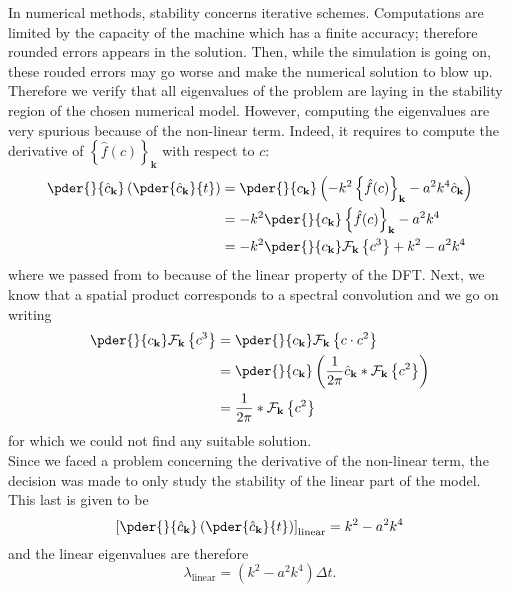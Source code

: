 \documentclass[10pt,a4paper,twocolumn]{article}
\begin{document}
In numerical methods, stability concerns iterative schemes. Computations are limited by the capacity of the machine which has a finite accuracy; therefore rounded errors appears in the solution. Then, while the simulation is going on, these rouded errors may go worse and make the numerical solution to blow up. Therefore we verify that all eigenvalues of the problem are laying in the stability region of the chosen numerical model. However, computing the eigenvalues are very spurious because of the non-linear term. Indeed, it requires to compute the derivative of $\left\{\hat f(c)\right\}_\mathbf{k}$ with respect to $c$:
\begin{align}
	\pder{}{\hat c_\mathbf{k}}\left(\pder{\hat c_\mathbf{k}}{t}\right) &= \pder{}{c_\mathbf{k}} \left( -k^2 \left\{ \hat f(c) \right\}_\mathbf{k} - a^2 k^4 \hat c_\mathbf{k} \right) \label{eq:stability_1} \\
	&= -k^2 \pder{}{c_\mathbf{k}} \left\{ \hat f(c) \right\}_\mathbf{k} - a^2 k^4 \label{eq:stability_2} \\
	&= -k^2 \pder{}{c_\mathbf{k}} \mathcal{F}_\mathbf{k}\left\{ c^3 \right\} + k^2 - a^2 k^4 \label{eq:stability_3}
\end{align}
where we passed from  to  because of the linear property of the DFT. Next, we know that a spatial product corresponds to a spectral convolution and we go on writing
\begin{align}
	\pder{}{c_\mathbf{k}} \mathcal{F}_\mathbf{k}\left\{ c^3 \right\} &= \pder{}{c_\mathbf{k}} \mathcal{F}_\mathbf{k}\left\{ c \cdot c^2 \right\} \\
	&= \pder{}{c_\mathbf{k}} \left( \frac{1}{2\pi} \hat c_\mathbf{k} * \mathcal{F}_\mathbf{k}\left\{ c^2 \right\} \right) \\
	&= \frac{1}{2\pi} * \mathcal{F}_\mathbf{k}\left\{ c^2 \right\}
\end{align}
for which we could not find any suitable solution.
\vspace{\baselineskip}\\
Since we faced a problem concerning the derivative of the non-linear term, the decision was made to only study the stability of the linear part of the model. This last is given to be
\begin{equation}
	\left[ \pder{}{\hat c_\mathbf{k}}\left(\pder{\hat c_\mathbf{k}}{t}\right) \right]_{\text{linear}} = k^2 - a^2 k^4
\end{equation}
and the linear eigenvalues are therefore
\begin{equation}
	\lambda_{\text{linear}} = \left( k^2 - a^2 k^4 \right) \Delta t.
\end{equation}
\end{document}
